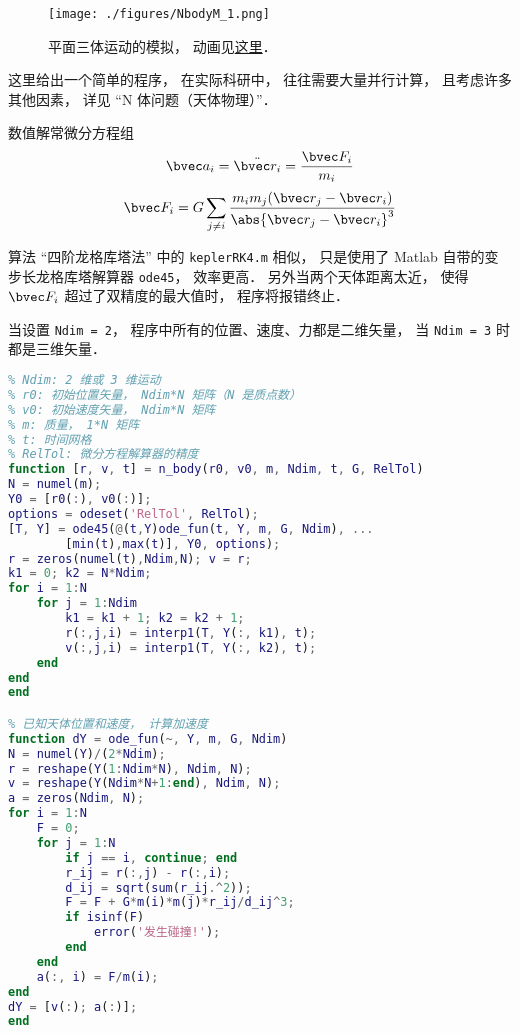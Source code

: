 
\begin{issues}
\issueDraft
\end{issues}


\begin{figure}[ht]
\centering
\texttt{[image: ./figures/NbodyM\_1.png]}
\caption{平面三体运动的模拟， 动画见\href{https://wuli.wiki/apps/3body.html}{这里}．} \label{NbodyM_fig1}
\end{figure}


这里给出一个简单的程序， 在实际科研中， 往往需要大量并行计算， 且考虑许多其他因素， 详见 “N 体问题（天体物理）”．

数值解常微分方程组
\begin{equation}
\bvec a_i = \ddot{\bvec r_i} = \frac{\bvec F_i}{m_i}
\end{equation}
\begin{equation}
\bvec F_i = G\sum_{j\ne i} \frac{m_i m_j(\bvec r_j - \bvec r_i)}{\abs{\bvec r_j - \bvec r_i}^3}
\end{equation}

算法 “四阶龙格库塔法” 中的 \verb|keplerRK4.m| 相似， 只是使用了 Matlab 自带的变步长龙格库塔解算器 \verb|ode45|， 效率更高． 另外当两个天体距离太近， 使得 $\bvec F_i$ 超过了双精度的最大值时， 程序将报错终止．

当设置 \verb|Ndim = 2|， 程序中所有的位置、速度、力都是二维矢量， 当 \verb|Ndim = 3| 时都是三维矢量．


\begin{lstlisting}[language=matlab, caption=n\_body.m]
% N 体问题（支持二维或三维）
% Ndim: 2 维或 3 维运动
% r0: 初始位置矢量， Ndim*N 矩阵（N 是质点数）
% v0: 初始速度矢量， Ndim*N 矩阵
% m: 质量， 1*N 矩阵
% t: 时间网格
% RelTol: 微分方程解算器的精度
function [r, v, t] = n_body(r0, v0, m, Ndim, t, G, RelTol)
N = numel(m);
Y0 = [r0(:), v0(:)];
options = odeset('RelTol', RelTol);
[T, Y] = ode45(@(t,Y)ode_fun(t, Y, m, G, Ndim), ...
        [min(t),max(t)], Y0, options);
r = zeros(numel(t),Ndim,N); v = r;
k1 = 0; k2 = N*Ndim;
for i = 1:N
    for j = 1:Ndim
        k1 = k1 + 1; k2 = k2 + 1;
        r(:,j,i) = interp1(T, Y(:, k1), t);
        v(:,j,i) = interp1(T, Y(:, k2), t);
    end
end
end

% 已知天体位置和速度， 计算加速度
function dY = ode_fun(~, Y, m, G, Ndim)
N = numel(Y)/(2*Ndim);
r = reshape(Y(1:Ndim*N), Ndim, N);
v = reshape(Y(Ndim*N+1:end), Ndim, N);
a = zeros(Ndim, N);
for i = 1:N
    F = 0;
    for j = 1:N
        if j == i, continue; end
        r_ij = r(:,j) - r(:,i);
        d_ij = sqrt(sum(r_ij.^2));
        F = F + G*m(i)*m(j)*r_ij/d_ij^3;
        if isinf(F)
            error('发生碰撞!');
        end
    end
    a(:, i) = F/m(i);
end
dY = [v(:); a(:)];
end
\end{lstlisting}

